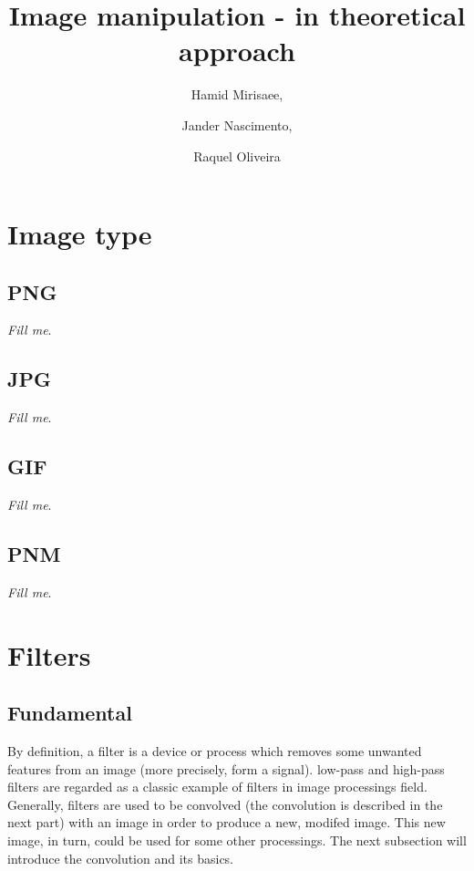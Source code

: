 \documentclass{article}
\begin{document}
\title{Image manipulation - in theoretical approach}

\author{Hamid Mirisaee,
\and Jander Nascimento, 
\and Raquel Oliveira}

\maketitle

\tableofcontents

\section{Image type}

	\subsection{PNG}

		\textit{Fill me}.

	\subsection{JPG}

		\textit{Fill me}.

	\subsection{GIF}

		\textit{Fill me}.

	\subsection{PNM}

		\textit{Fill me}.

\section{Filters}

	\subsection{Fundamental}

		By definition, a filter is a device or process which removes some unwanted features from an image (more precisely, form a signal).
		low-pass and high-pass filters are regarded as a classic example of filters in image processings field. Generally, filters are used to be convolved 
		(the convolution is described in the next part) with an image in order to produce a new, modifed image. This new image, in turn, could
		be used for some other processings. The next subsection will introduce the convolution and its basics.
		
\end{document}
